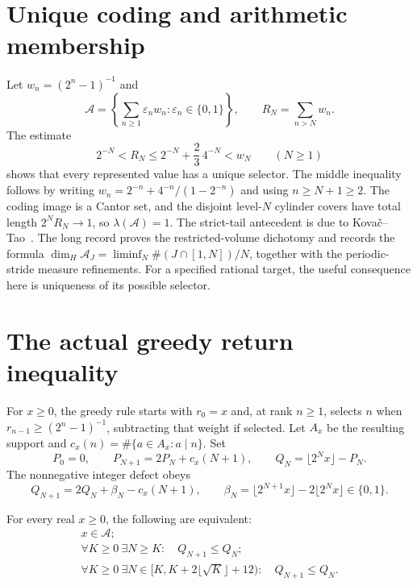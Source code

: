 \documentclass[11pt]{article}
\newcommand{\Ach}{\mathcal A}
\begin{document}
\section{Unique coding and arithmetic membership}\label{sec:geometry}
Let $w_n=(2^n-1)^{-1}$ and
\[
 \Ach=\left\{\sum_{n\ge1}\varepsilon_nw_n:
                   \varepsilon_n\in\{0,1\}\right\},\qquad
 R_N=\sum_{n>N}w_n.
\]
The estimate
\[
 2^{-N}<R_N\le2^{-N}+\frac23\,4^{-N}<w_N\qquad(N\ge1)
\]
shows that every represented value has a unique selector.
The middle inequality follows by writing
$w_n=2^{-n}+4^{-n}/(1-2^{-n})$ and using $n\ge N+1\ge2$.
The coding image is a Cantor set, and the disjoint level-$N$ cylinder
covers have total length $2^NR_N\to1$, so $\lambda(\Ach)=1$.
The strict-tail antecedent is due to Kova\v{c}--Tao~\cite[Remark~4.1]{kovactao}.
The long record proves the restricted-volume dichotomy and records the
formula $\dim_H\Ach_J=\liminf_N\#(J\cap[1,N])/N$, together with the
periodic-stride measure refinements.  For a specified rational target,
the useful consequence here is uniqueness of its possible selector.

\section{The actual greedy return inequality}\label{sec:actual-repairs}
For $x\ge0$, the greedy rule starts with $r_0=x$ and, at rank $n\ge1$,
selects $n$ when $r_{n-1}\ge(2^n-1)^{-1}$, subtracting that weight if
selected.  Let $A_x$ be the resulting support and
$c_x(n)=\#\{a\in A_x:a\mid n\}$.  Set
\[
 P_0=0,\qquad P_{N+1}=2P_N+c_x(N+1),\qquad
 Q_N=\lfloor2^Nx\rfloor-P_N.
\]
The nonnegative integer defect obeys
\begin{equation}
 Q_{N+1}=2Q_N+\beta_N-c_x(N+1),\qquad
 \beta_N=\lfloor2^{N+1}x\rfloor-2\lfloor2^Nx\rfloor\in\{0,1\}.
 \label{eq:actual-repair-recurrence}
\end{equation}

\begin{theorem}\label{res:general-repair}
For every real $x\ge0$, the following are equivalent:
\[
 \begin{gathered}
 x\in\Ach;\\
 \forall K\ge0\ \exists N\ge K:\quad Q_{N+1}\le Q_N;\\
 \forall K\ge0\ \exists N\in[K,K+2\lfloor\sqrt K\rfloor+12):
 \quad Q_{N+1}\le Q_N.
 \end{gathered}
\]
\end{theorem}
\end{document}
